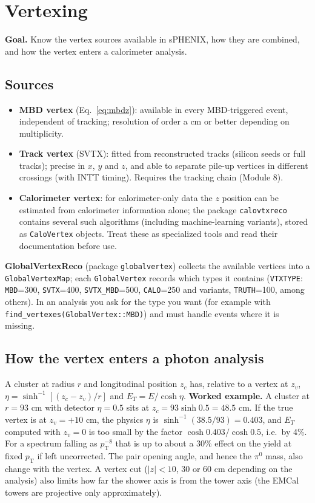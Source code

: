 \documentclass[11pt,letterpaper]{article}
\newcommand{\goal}[1]{\noindent\textbf{Goal.} #1\par}
\newcommand{\pT}{p_{\mathrm{T}}}
\begin{document}
\section{Vertexing}\label{sec:vertex}
\goal{Know the vertex sources available in sPHENIX, how they are combined, and how the vertex enters a calorimeter analysis.}

\subsection{Sources}
\begin{itemize}
\item \textbf{MBD vertex} (Eq.~\ref{eq:mbdz}): available in every MBD-triggered event, independent of tracking; resolution of
order a cm or better depending on multiplicity.
\item \textbf{Track vertex} (SVTX): fitted from reconstructed tracks (silicon seeds or full tracks); precise in $x$, $y$ and $z$,
and able to separate pile-up vertices in different crossings (with INTT timing). Requires the tracking chain (Module 8).
\item \textbf{Calorimeter vertex}: for calorimeter-only data the $z$ position can be estimated from calorimeter information alone;
the package \texttt{calovtxreco} contains several such algorithms (including machine-learning variants), stored as
\texttt{CaloVertex} objects. Treat these as specialized tools and read their documentation before use.
\end{itemize}
\textbf{GlobalVertexReco} (package \texttt{globalvertex}) collects the available vertices into a \texttt{GlobalVertexMap};
each \texttt{GlobalVertex} records which types it contains (\texttt{VTXTYPE}: \texttt{MBD}=300, \texttt{SVTX}=400,
\texttt{SVTX\_MBD}=500, \texttt{CALO}=250 and variants, \texttt{TRUTH}=100, among others). In an analysis you ask for the type you
want (for example with \texttt{find\_vertexes(GlobalVertex::MBD)}) and must handle events where it is missing.

\subsection{How the vertex enters a photon analysis}
A cluster at radius $r$ and longitudinal position $z_c$ has, relative to a vertex at $z_v$,
$\eta=\sinh^{-1}\!\left[(z_c-z_v)/r\right]$ and $E_T=E/\cosh\eta$. \textbf{Worked example.} A cluster at $r=93$ cm with
detector $\eta=0.5$ sits at $z_c=93\sinh0.5=48.5$ cm. If the true vertex is at $z_v=+10$ cm, the physics $\eta$ is
$\sinh^{-1}(38.5/93)=0.403$, and $E_T$ computed with $z_v=0$ is too small by the factor $\cosh0.403/\cosh0.5$, i.e.\ by 4\%.
For a spectrum falling as $\pT^{-8}$ that is up to about a 30\% effect on the yield at fixed $\pT$ if left uncorrected. The pair opening
angle, and hence the $\pi^0$ mass, also change with the vertex. A vertex cut ($|z|<10$, 30 or 60 cm depending on the analysis)
also limits how far the shower axis is from the tower axis (the EMCal towers are projective only approximately).
\end{document}
